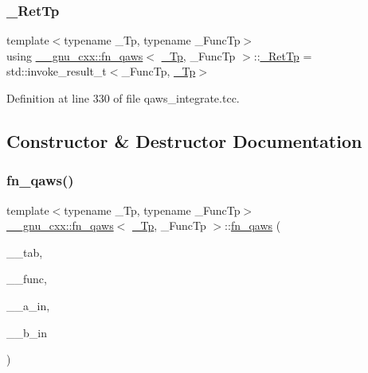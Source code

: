 \subsubsection{\texorpdfstring{\+\_\+\+Ret\+Tp}{\_RetTp}}
{\footnotesize\ttfamily template$<$typename \+\_\+\+Tp, typename \+\_\+\+Func\+Tp$>$ \\
using \hyperlink{struct____gnu__cxx_1_1fn__qaws}{\+\_\+\+\_\+gnu\+\_\+cxx\+::fn\+\_\+qaws}$<$ \hyperlink{namespace____gnu__cxx_a3b19a9c800ca194374ef9172290f7d79}{\+\_\+\+Tp}, \+\_\+\+Func\+Tp $>$\+::\hyperlink{struct____gnu__cxx_1_1fn__qaws_afb28f16c42d0f494bfe2d48e2524a5b1}{\+\_\+\+Ret\+Tp} =  std\+::invoke\+\_\+result\+\_\+t$<$\+\_\+\+Func\+Tp, \hyperlink{namespace____gnu__cxx_a3b19a9c800ca194374ef9172290f7d79}{\+\_\+\+Tp}$>$}



Definition at line 330 of file qaws\+\_\+integrate.\+tcc.



\subsection{Constructor \& Destructor Documentation}
\mbox{\label{struct____gnu__cxx_1_1fn__qaws_a5e73b46a15a77c92f516c0ebad8a836a}} 
\subsubsection{\texorpdfstring{fn\+\_\+qaws()}{fn\_qaws()}}
{\footnotesize\ttfamily template$<$typename \+\_\+\+Tp, typename \+\_\+\+Func\+Tp$>$ \\
\hyperlink{struct____gnu__cxx_1_1fn__qaws}{\+\_\+\+\_\+gnu\+\_\+cxx\+::fn\+\_\+qaws}$<$ \hyperlink{namespace____gnu__cxx_a3b19a9c800ca194374ef9172290f7d79}{\+\_\+\+Tp}, \+\_\+\+Func\+Tp $>$\+::\hyperlink{struct____gnu__cxx_1_1fn__qaws}{fn\+\_\+qaws} (\begin{DoxyParamCaption}\item[{const \hyperlink{struct____gnu__cxx_1_1qaws__integration__table}{qaws\+\_\+integration\+\_\+table}$<$ \hyperlink{namespace____gnu__cxx_a3b19a9c800ca194374ef9172290f7d79}{\+\_\+\+Tp} $>$ $\ast$}]{\+\_\+\+\_\+tab,  }\item[{\+\_\+\+Func\+Tp}]{\+\_\+\+\_\+func,  }\item[{\hyperlink{namespace____gnu__cxx_a3b19a9c800ca194374ef9172290f7d79}{\+\_\+\+Tp}}]{\+\_\+\+\_\+a\+\_\+in,  }\item[{\hyperlink{namespace____gnu__cxx_a3b19a9c800ca194374ef9172290f7d79}{\+\_\+\+Tp}}]{\+\_\+\+\_\+b\+\_\+in }\end{DoxyParamCaption})\hspace{0.3cm}{\ttfamily [inline]}}



